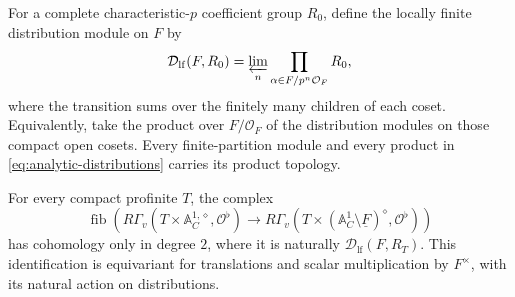 \begin{definition}
\label{def:locally-finite-distributions}
For a complete characteristic-\(p\) coefficient group \(R_0\), define
the locally finite distribution module on \(F\) by
\begin{equation}
 \mathcal D_{\mathrm{lf}}(F,R_0)
 =
 \varprojlim_n
 \prod_{\alpha\in F/p^n\mathcal O_F} R_0,
 \label{eq:analytic-distributions}
\end{equation}
where the transition sums over the finitely many children of each
coset.  Equivalently, take the product over \(F/\mathcal O_F\) of
the distribution modules on those compact open cosets.
Every finite-partition module and every product in
\eqref{eq:analytic-distributions} carries its product topology.
\end{definition}

\begin{proposition}
\label{prop:field-support}
For every compact profinite \(T\), the complex
\[
 \operatorname{fib}\left(
 R\Gamma_v(T\times\mathbb A^{1,\diamond}_C,\mathcal O^\flat)
 \longrightarrow
 R\Gamma_v(T\times
       (\mathbb A^1_C\setminus\underline F)^\diamond,
       \mathcal O^\flat)\right)
\]
has cohomology only in degree \(2\), where it is naturally
\(\mathcal D_{\mathrm{lf}}(F,R_T)\).
This identification is equivariant for translations and scalar
multiplication by \(F^\times\), with its natural action on
distributions.
\end{proposition}


